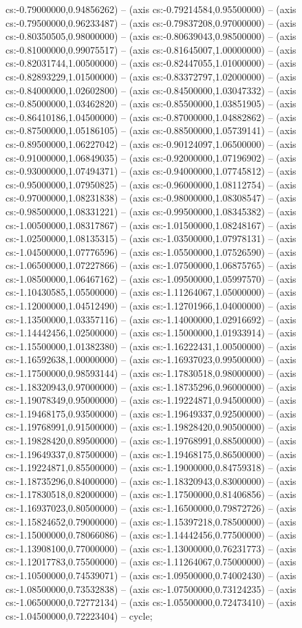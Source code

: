 cs:-0.79000000,0.94856262) -- (axis cs:-0.79214584,0.95500000) -- (axis cs:-0.79500000,0.96233487) -- (axis cs:-0.79837208,0.97000000) -- (axis cs:-0.80350505,0.98000000) -- (axis cs:-0.80639043,0.98500000) -- (axis cs:-0.81000000,0.99075517) -- (axis cs:-0.81645007,1.00000000) -- (axis cs:-0.82031744,1.00500000) -- (axis cs:-0.82447055,1.01000000) -- (axis cs:-0.82893229,1.01500000) -- (axis cs:-0.83372797,1.02000000) -- (axis cs:-0.84000000,1.02602800) -- (axis cs:-0.84500000,1.03047332) -- (axis cs:-0.85000000,1.03462820) -- (axis cs:-0.85500000,1.03851905) -- (axis cs:-0.86410186,1.04500000) -- (axis cs:-0.87000000,1.04882862) -- (axis cs:-0.87500000,1.05186105) -- (axis cs:-0.88500000,1.05739141) -- (axis cs:-0.89500000,1.06227042) -- (axis cs:-0.90124097,1.06500000) -- (axis cs:-0.91000000,1.06849035) -- (axis cs:-0.92000000,1.07196902) -- (axis cs:-0.93000000,1.07494371) -- (axis cs:-0.94000000,1.07745812) -- (axis cs:-0.95000000,1.07950825) -- (axis cs:-0.96000000,1.08112754) -- (axis cs:-0.97000000,1.08231838) -- (axis cs:-0.98000000,1.08308547) -- (axis cs:-0.98500000,1.08331221) -- (axis cs:-0.99500000,1.08345382) -- (axis cs:-1.00500000,1.08317867) -- (axis cs:-1.01500000,1.08248167) -- (axis cs:-1.02500000,1.08135315) -- (axis cs:-1.03500000,1.07978131) -- (axis cs:-1.04500000,1.07776596) -- (axis cs:-1.05500000,1.07526590) -- (axis cs:-1.06500000,1.07227866) -- (axis cs:-1.07500000,1.06875765) -- (axis cs:-1.08500000,1.06467162) -- (axis cs:-1.09500000,1.05997570) -- (axis cs:-1.10430585,1.05500000) -- (axis cs:-1.11264067,1.05000000) -- (axis cs:-1.12000000,1.04512490) -- (axis cs:-1.12701966,1.04000000) -- (axis cs:-1.13500000,1.03357116) -- (axis cs:-1.14000000,1.02916692) -- (axis cs:-1.14442456,1.02500000) -- (axis cs:-1.15000000,1.01933914) -- (axis cs:-1.15500000,1.01382380) -- (axis cs:-1.16222431,1.00500000) -- (axis cs:-1.16592638,1.00000000) -- (axis cs:-1.16937023,0.99500000) -- (axis cs:-1.17500000,0.98593144) -- (axis cs:-1.17830518,0.98000000) -- (axis cs:-1.18320943,0.97000000) -- (axis cs:-1.18735296,0.96000000) -- (axis cs:-1.19078349,0.95000000) -- (axis cs:-1.19224871,0.94500000) -- (axis cs:-1.19468175,0.93500000) -- (axis cs:-1.19649337,0.92500000) -- (axis cs:-1.19768991,0.91500000) -- (axis cs:-1.19828420,0.90500000) -- (axis cs:-1.19828420,0.89500000) -- (axis cs:-1.19768991,0.88500000) -- (axis cs:-1.19649337,0.87500000) -- (axis cs:-1.19468175,0.86500000) -- (axis cs:-1.19224871,0.85500000) -- (axis cs:-1.19000000,0.84759318) -- (axis cs:-1.18735296,0.84000000) -- (axis cs:-1.18320943,0.83000000) -- (axis cs:-1.17830518,0.82000000) -- (axis cs:-1.17500000,0.81406856) -- (axis cs:-1.16937023,0.80500000) -- (axis cs:-1.16500000,0.79872726) -- (axis cs:-1.15824652,0.79000000) -- (axis cs:-1.15397218,0.78500000) -- (axis cs:-1.15000000,0.78066086) -- (axis cs:-1.14442456,0.77500000) -- (axis cs:-1.13908100,0.77000000) -- (axis cs:-1.13000000,0.76231773) -- (axis cs:-1.12017783,0.75500000) -- (axis cs:-1.11264067,0.75000000) -- (axis cs:-1.10500000,0.74539071) -- (axis cs:-1.09500000,0.74002430) -- (axis cs:-1.08500000,0.73532838) -- (axis cs:-1.07500000,0.73124235) -- (axis cs:-1.06500000,0.72772134) -- (axis cs:-1.05500000,0.72473410) -- (axis cs:-1.04500000,0.72223404) -- cycle;
